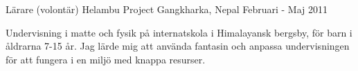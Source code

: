 \begin{cventries}
\cventry
{L{\"a}rare (volont{\"a}r)} %
{Helambu Project} %
{Gangkharka, Nepal} %
{Februari - Maj 2011} %
{ %
\begin{cvitems}
\item {Undervisning i matte och fysik p{\aa} internatskola i Himalayansk bergsby, f{\"o}r barn i {\aa}ldrarna 7-15 {\aa}r. 
			Jag l{\"a}rde mig att anv{\"a}nda fantasin och anpassa undervisningen f{\"o}r att fungera i en milj{\"o} med knappa resurser.}
\end{cvitems}
}

\end{cventries}